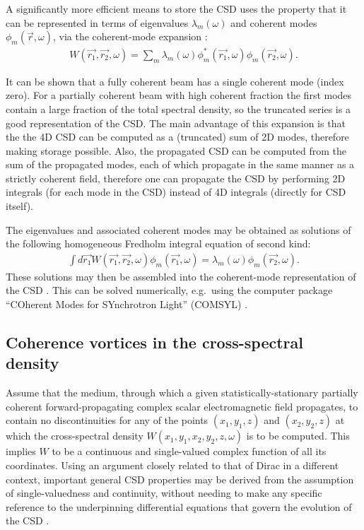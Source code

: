 \documentclass[%
 reprint,
 amsmath,amssymb,
 aps,
]{revtex4-1}
\begin{document}
A significantly more efficient means to store the CSD uses the property that it can be represented in terms of eigenvalues $\lambda_m(\omega)$ and coherent modes $\phi_m(\vec{r}, \omega)$, via the coherent-mode expansion
\cite{Wolf1982,mandel_wolf}:
\begin{equation}
\begin{aligned}
W(\vec{r_1}, \vec{r_2}, \omega)
=
\sum_m
\lambda_m(\omega)
\phi_m^*(\vec{r_1},\omega)
\phi_m(\vec{r_2}, \omega).
\end{aligned}
\end{equation}

It can be shown that a fully coherent beam has a single coherent mode (index zero). For a partially coherent beam with high coherent fraction the first modes contain a large fraction of the total spectral density, so the truncated series is a good representation of the CSD. The main advantage of this expansion is that the the 4D CSD can be computed as a (truncated) sum of 2D modes, therefore making storage possible. Also, the propagated CSD can be computed from the sum of the propagated modes, each of which propagate in the same manner as a strictly coherent field, therefore one can propagate the CSD by performing 2D integrals (for each mode in the CSD) instead of 4D integrals (directly for CSD itself).  

The eigenvalues and associated coherent modes may be obtained as solutions of the following homogeneous Fredholm integral equation of second kind:
\begin{equation}
\begin{aligned}
\label{fredholm_equation}
\int d\vec{r_1}
W(\vec{r_1},\vec{r_2}, \omega){\phi}_m(\vec{r_1},
\omega)=\lambda_m(\omega)\phi_m(\vec{r_2}, \omega).
\end{aligned}
\end{equation}
These solutions may then be assembled into the coherent-mode representation of the CSD \cite{Wolf1982}.  This can be solved numerically, e.g.~using the computer package ``COherent Modes for SYnchrotron Light'' (COMSYL) \cite{glass}.

\subsection{Coherence vortices in the cross-spectral density}

Assume that the medium, through which a given statistically-stationary partially coherent forward-propagating complex scalar electromagnetic field propagates, to contain no discontinuities for any of the points $(x_1,y_1,z)$ and $(x_2,y_2,z)$ at which the cross-spectral density $W(x_1,y_1,x_2,y_2,z,\omega)$ is to be computed. This implies $W$ to be a continuous and single-valued complex function of all its coordinates.  Using an argument closely related to that of Dirac \citeyear{Dirac1931} in a different context, important general CSD properties may be derived from the assumption of single-valuedness and continuity, without needing to make any specific reference to the underpinning differential equations that govern the evolution of the CSD \cite{Marasinghe2010}. 
\end{document}

